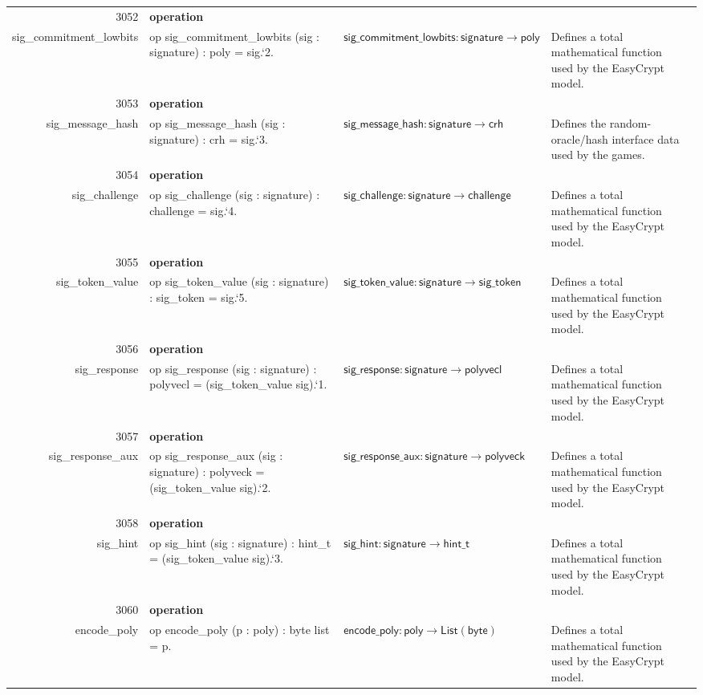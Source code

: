 \documentclass[10pt]{article}
\newcommand{\ec}[1]{\begingroup\ttfamily\scriptsize #1\endgroup}
\begin{document}
\begin{longtable}{r L{0.17\textwidth} L{0.26\textwidth} L{0.27\textwidth} L{0.20\textwidth}}
3052 & \textbf{operation}\\\ec{sig\_commitment\_lowbits} & \ec{op sig\_commitment\_lowbits (sig : signature) : poly = sig.`2.} & \(\mathsf{sig\_commitment\_lowbits} : \mathsf{signature} \to \mathsf{poly}\) & Defines a total mathematical function used by the EasyCrypt model. \\
3053 & \textbf{operation}\\\ec{sig\_message\_hash} & \ec{op sig\_message\_hash (sig : signature) : crh = sig.`3.} & \(\mathsf{sig\_message\_hash} : \mathsf{signature} \to \mathsf{crh}\) & Defines the random-oracle/hash interface data used by the games. \\
3054 & \textbf{operation}\\\ec{sig\_challenge} & \ec{op sig\_challenge (sig : signature) : challenge = sig.`4.} & \(\mathsf{sig\_challenge} : \mathsf{signature} \to \mathsf{challenge}\) & Defines a total mathematical function used by the EasyCrypt model. \\
3055 & \textbf{operation}\\\ec{sig\_token\_value} & \ec{op sig\_token\_value (sig : signature) : sig\_token = sig.`5.} & \(\mathsf{sig\_token\_value} : \mathsf{signature} \to \mathsf{sig\_token}\) & Defines a total mathematical function used by the EasyCrypt model. \\
3056 & \textbf{operation}\\\ec{sig\_response} & \ec{op sig\_response (sig : signature) : polyvecl = (sig\_token\_value sig).`1.} & \(\mathsf{sig\_response} : \mathsf{signature} \to \mathsf{polyvecl}\) & Defines a total mathematical function used by the EasyCrypt model. \\
3057 & \textbf{operation}\\\ec{sig\_response\_aux} & \ec{op sig\_response\_aux (sig : signature) : polyveck = (sig\_token\_value sig).`2.} & \(\mathsf{sig\_response\_aux} : \mathsf{signature} \to \mathsf{polyveck}\) & Defines a total mathematical function used by the EasyCrypt model. \\
3058 & \textbf{operation}\\\ec{sig\_hint} & \ec{op sig\_hint (sig : signature) : hint\_t = (sig\_token\_value sig).`3.} & \(\mathsf{sig\_hint} : \mathsf{signature} \to \mathsf{hint\_t}\) & Defines a total mathematical function used by the EasyCrypt model. \\
3060 & \textbf{operation}\\\ec{encode\_poly} & \ec{op encode\_poly (p : poly) : byte list = p.} & \(\mathsf{encode\_poly} : \mathsf{poly} \to \mathsf{List}(\mathsf{byte})\) & Defines a total mathematical function used by the EasyCrypt model. \\

\end{longtable}
\end{document}
